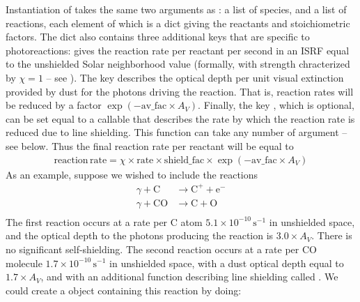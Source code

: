 \documentclass[letterpaper,10pt,english]{sphinxmanual}
\begin{document}
Instantiation of  takes the same two arguments as
{\hyperref[chemistry:ssssec\string-reaction\string-matrix]{}}: a list of species, and a list of
reactions, each element of which is a dict giving the reactants and
stoichiometric factors. The dict also contains three additional keys
that are specific to photoreactions:  gives the reaction rate
per reactant per second in an ISRF equal to the unshielded Solar
neighborhood value (formally, with strength chracterized by
\(\chi = 1\) -- see {\hyperref[cloudfiles:tab\string-cloudfiles]{}}). The key 
describes the optical depth per unit visual extinction provided by
dust for the photons driving the reaction. That is, reaction rates
will be reduced by a factor \(\exp(-\mathrm{av\_fac}\times
A_V)\). Finally, the key , which is optional, can be set
equal to a callable that describes the rate by which the reaction rate
is reduced due to line shielding. This function can take any number of
argument -- see below. Thus the final reaction rate per reactant will
be equal to
\begin{equation*}
\begin{split}\mathrm{reaction\, rate} = \chi \times \mathrm{rate} \times
\mathrm{shield\_fac} \times \exp(-\mathrm{av\_fac}\times A_V)\end{split}
\end{equation*}
As an example, suppose we wished to include the reactions
\begin{equation*}
\begin{split}\gamma + \mathrm{C} & \rightarrow \mathrm{C}^+ + \mathrm{e}^- \\
\gamma + \mathrm{CO} & \rightarrow \mathrm{C} + \mathrm{O} \\\end{split}
\end{equation*}
The first reaction occurs at a rate per C atom \(5.1\times
10^{-10}\,\mathrm{s}^{-1}\) in unshielded space, and the optical depth
to the photons producing the reaction is \(3.0\times A_V\). There
is no significant self-shielding. The second reaction occurs at a rate
per CO molecule \(1.7\times 10^{-10}\,\mathrm{s}^{-1}\) in
unshielded space, with a dust optical depth equal to \(1.7\times
A_V\), and with an additional function describing line shielding called
. We could create a  object containing
this reaction by doing:
\end{document}
